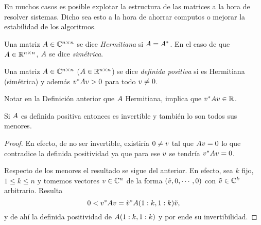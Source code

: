 \begin{tcolorbox}
En muchos casos es posible explotar la estructura de las matrices a la hora de resolver sistemas. Dicho sea esto a la hora de ahorrar computos o mejorar la estabilidad de los algoritmos.

\begin{tcolorbox}
 \begin{defi}
 Una matriz $\Ab\in \Cnn$ se dice \emph{Hermitiana} si $\Ab=\Ab^*$. En el caso de que $\Ab\in \Rnn$, $\Ab$ se dice \emph{simétrica}.
\end{defi}

\begin{defi}
 Una matriz $\Ab\in \Cnn$ ($\Ab\in \Rnn$)  se dice \emph{definida positiva} si es Hermitiana (simétrica) y además $\vb^*\Ab\vb>0$ para todo $\vb\neq 0$.
\end{defi}
\end{tcolorbox}
Notar en la Definición anterior que
$\Ab$ Hermitiana, implica que $\vb^*\Ab\vb\in \R$.

\begin{prop}
\label{prop:defposesinvert}
Si $\Ab$ es definida positiva entonces es invertible y también lo son todos sus menores.
\end{prop}
\begin{proof}
 En efecto, de no ser invertible, existiría $\cero\neq\vb$ tal que
 $\Ab\vb=\cero$ lo que contradice la definida positividad ya que para ese $\vb$ se tendría $\vb^*\Ab\vb=0$.

 Respecto de los menores el resultado se sigue del anterior. En efecto, sea $k$ fijo, $1\le k\le n$ y tomemos
 vectores $\vb\in \C^n$ de la forma
 $(\tilde \vb,0,\cdots,0)$ con $\tilde \vb \in \C^k$ arbitrario. Resulta
 $$
 0<\vb^*\Ab\vb=\tilde\vb^*\Ab(1:k,1:k)\tilde \vb,
 $$
 y de ahí la definida positividad de $\Ab(1:k,1:k)$ y por ende su invertibilidad.
\end{proof}



\end{tcolorbox}

